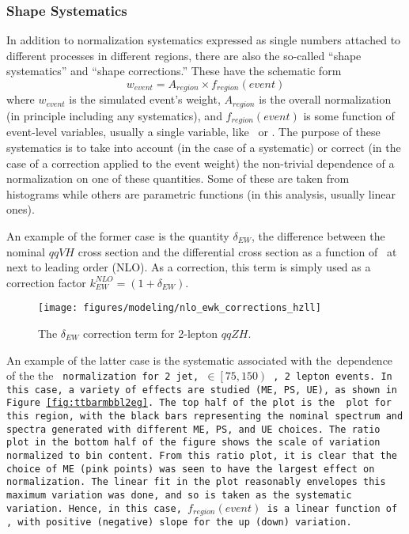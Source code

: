 \subsubsection{Shape Systematics}
\label{sec:shapesys}
In addition to normalization systematics expressed as single numbers attached to different processes in different regions, there are also the so-called ``shape systematics'' and ``shape corrections.''  These have the schematic form
\begin{equation}
\label{eqn:shapesys}
w_{event} = A_{region}\times f_{region}\left(event\right)
\end{equation}
where $w_{event}$ is the simulated event's weight, $A_{region}$ is the overall normalization (in principle including any systematics), and $f_{region}\left(event\right)$ is some function of event-level variables, usually a single variable, like \ptv\, or \mbb.  The purpose of these systematics is to take into account (in the case of a systematic) or correct (in the case of a correction applied to the event weight) the non-trivial dependence of a normalization on one of these quantities.  Some of these are taken from histograms while others are parametric functions (in this analysis, usually linear ones).

An example of the former case is the quantity $\delta_{EW}$, the difference between the nominal $qqVH$ cross section and the differential cross section as a function of \ptv\, at next to leading order (NLO).  As a correction, this term is simply used as a correction factor $k_{EW}^{NLO}=\left(1+\delta_{EW}\right)$.  
\begin{figure}[!htbp]\captionsetup{justification=centering}
  \centering
  \centering\texttt{[image: figures/modeling/nlo\_ewk\_corrections\_hzll]}
  \caption{The $\delta_{EW}$ correction term for 2-lepton $qqZH$.}
  \label{fig:nloewkdelta}
\end{figure}

An example of the latter case is the systematic associated with the \mbb\,dependence of the the \tt\,normalization for 2 jet, \ptv$\in\left[75,150\right)$ \GeV, 2 lepton events.  In this case, a variety of effects are studied (ME, PS, UE), as shown in Figure \ref{fig:ttbarmbbl2eg}.  The top half of the plot is the \mbb\,plot for this region, with the black bars representing the nominal spectrum and spectra generated with different ME, PS, and UE choices.  The ratio plot in the bottom half of the figure shows the scale of variation normalized to bin content.  From this ratio plot, it is clear that the choice of ME (pink points) was seen to have the largest effect on normalization.  The linear fit in the plot reasonably envelopes this maximum variation was done, and so is taken as the systematic variation.  Hence, in this case, $f_{region}\left(event\right)$ is a linear function of \mbb, with positive (negative) slope for the up (down) variation.  

